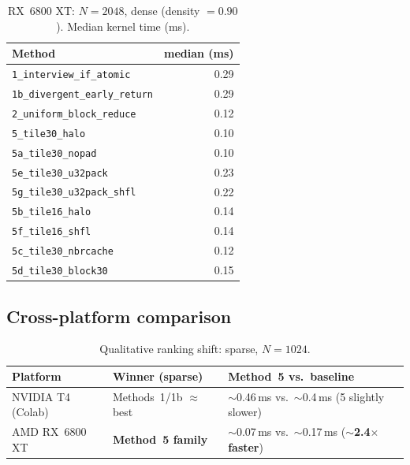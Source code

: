 \documentclass[11pt,a4paper]{article}
\begin{document}
\begin{table}[htbp]
  \centering
  \footnotesize
  \caption{RX~6800 XT: $N=2048$, dense (density $=0.90$). Median kernel time (ms).}
  \label{tab:amd-2048-dense}
  \begin{tabular}{@{}p{5.1cm}r@{}}
    \toprule
    Method & median (ms) \\
    \midrule
    \texttt{1\_interview\_if\_atomic}      & 0.29 \\
    \texttt{1b\_divergent\_early\_return} & 0.29 \\
    \texttt{2\_uniform\_block\_reduce}    & 0.12 \\
    \texttt{5\_tile30\_halo}              & 0.10 \\
    \texttt{5a\_tile30\_nopad}            & 0.10 \\
    \texttt{5e\_tile30\_u32pack}          & 0.23 \\
    \texttt{5g\_tile30\_u32pack\_shfl}    & 0.22 \\
    \texttt{5b\_tile16\_halo}              & 0.14 \\
    \texttt{5f\_tile16\_shfl}             & 0.14 \\
    \texttt{5c\_tile30\_nbrcache}          & 0.12 \\
    \texttt{5d\_tile30\_block30}          & 0.15 \\
    \bottomrule
  \end{tabular}
\end{table}

\subsection{Cross-platform comparison}

\begin{table}[h]
  \centering
  \caption{Qualitative ranking shift: sparse, $N{=}1024$.}
  \label{tab:cross}
  \begin{tabular}{@{}lll@{}}
    \toprule
    Platform & Winner (sparse) & Method~5 vs.\ baseline \\
    \midrule
    NVIDIA T4 (Colab)  & Methods~1/1b $\approx$ best & $\sim$0.46\,ms vs.\ $\sim$0.4\,ms (5 slightly slower) \\
    AMD RX~6800 XT     & \textbf{Method~5 family}    & $\sim$0.07\,ms vs.\ $\sim$0.17\,ms (\textbf{$\sim$2.4$\times$ faster}) \\
    \bottomrule
  \end{tabular}
\end{table}
\end{document}
